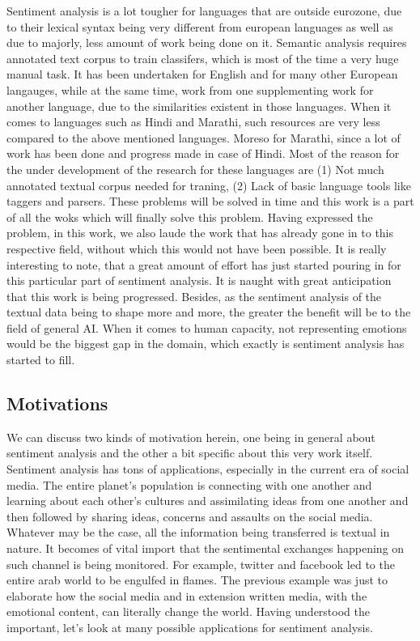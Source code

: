 \documentclass[conference]{IEEEtran}
\begin{document}
Sentiment analysis is a lot tougher for languages that are outside eurozone,
due to their lexical syntax being very different from european languages as
well as due to majorly, less amount of work being done on it. Semantic analysis
requires annotated text corpus to train classifers, which is most of the time a
very huge manual task. It has been undertaken for English and for many other
European langauges, while at the same time, work from one supplementing work
for another language, due to the similarities existent in those languages. When
it comes to languages such as Hindi and Marathi, such resources are very less
compared to the above mentioned languages. Moreso for Marathi, since a lot of
work has been done and progress made in case of Hindi. Most of the reason for
the under development of the research for these languages are (1) Not much
annotated textual corpus needed for traning, (2) Lack of basic language tools
like taggers and parsers. These problems will be solved in time and this work
is a part of all the woks which will finally solve this problem. 
Having expressed the problem, in this work, we also laude the work that has
already gone in to this respective field, without which this would not have
been possible. It is really interesting to note, that a great amount of effort
has just started pouring in for this particular part of sentiment analysis. It
is naught with great anticipation that this work is being progressed. Besides,
as the sentiment analysis of the textual data being to shape more and more, the
greater the benefit will be to the field of general AI. When it comes to human
capacity, not representing emotions would be the biggest gap in the domain,
which exactly is sentiment analysis has started to fill. \\



\subsection{Motivations}
We can discuss two kinds of motivation herein, one being in general about
sentiment analysis and the other a bit specific about this very work itself.
Sentiment analysis has tons of applications, especially in the current era of
social media. The entire planet's population is connecting with one another and
learning about each other's cultures and assimilating ideas from one another
and then followed by sharing ideas, concerns and assaults on the social media.
Whatever may be the case, all the information being transferred is textual in
nature. It becomes of vital import that the sentimental exchanges happening on
such channel is being monitored. For example, twitter and facebook led to the
entire arab world to be engulfed in flames. The previous example was just to
elaborate how the social media and in extension written media, with the
emotional content, can literally change the world. Having understood the
important, let's look at many possible applications for sentiment analysis.\\
\end{document}
